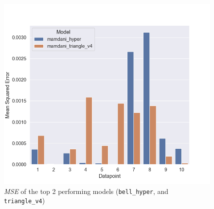 \documentclass[titlepage]{article}
\begin{document}
\begin{figure}[H]
\centering
\includegraphics[scale=0.4]{../images/eval_models/mse_2best}
\caption{\emph{MSE} of the top 2 performing models (\texttt{bell\_hyper}, and \texttt{triangle\_v4})}
\label{fig:mse_2best}
\end{figure}
\end{document}

